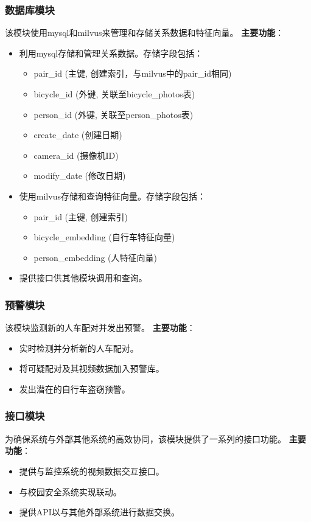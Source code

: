 \documentclass{article}
\begin{document}
\subsubsection{数据库模块}
该模块使用mysql和milvus来管理和存储关系数据和特征向量。
\newline
\newline
\textbf{主要功能}：
\begin{itemize}
    \item 利用mysql存储和管理关系数据。存储字段包括：
    \begin{itemize}
        \item pair\_id (主键, 创建索引，与milvus中的pair\_id相同)
        \item bicycle\_id (外键, 关联至bicycle\_photos表)
        \item person\_id (外键, 关联至person\_photos表)
        \item create\_date (创建日期)
        \item camera\_id (摄像机ID)
        \item modify\_date (修改日期)
    \end{itemize}
    \item 使用milvus存储和查询特征向量。存储字段包括：
    \begin{itemize}
        \item pair\_id (主键, 创建索引)
        \item bicycle\_embedding (自行车特征向量)
        \item person\_embedding (人特征向量)
    \end{itemize}
    \item 提供接口供其他模块调用和查询。
\end{itemize}

\subsubsection{预警模块}
该模块监测新的人车配对并发出预警。
\newline
\newline
\textbf{主要功能}：
\begin{itemize}
    \item 实时检测并分析新的人车配对。
    \item 将可疑配对及其视频数据加入预警库。
    \item 发出潜在的自行车盗窃预警。
\end{itemize}

\subsubsection{接口模块}
为确保系统与外部其他系统的高效协同，该模块提供了一系列的接口功能。
\newline
\newline
\textbf{主要功能}：
\begin{itemize}
    \item 提供与监控系统的视频数据交互接口。
    \item 与校园安全系统实现联动。
    \item 提供API以与其他外部系统进行数据交换。
\end{itemize}
\end{document}
